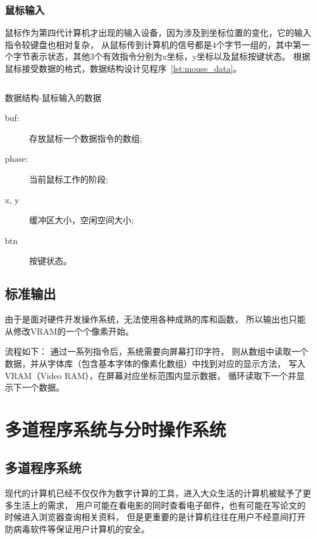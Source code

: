
\subsubsection{鼠标输入}

鼠标作为第四代计算机才出现的输入设备，因为涉及到坐标位置的变化，它的输入指令较键盘也相对复杂，
从鼠标传到计算机的信号都是4个字节一组的，其中第一个字节表示状态，其他3个有效指令分别为x坐标，y坐标以及鼠标按键状态。
根据鼠标接受数据的格式，数据结构设计见程序~\ref{lst:mouse_data}。

\begin{listing}[H]
  \inputminted[tabsize=2, firstline=126, lastline=129,
    linenos=true]{c}{../ZOS/src/kernel/bootpack.h}
  \caption{数据结构-鼠标输入的数据}
  \label{lst:mouse_data}
\end{listing}
\begin{description}
\item[buf:]存放鼠标一个数据指令的数组;
\item[phase:]当前鼠标工作的阶段;
\item[x, y]缓冲区大小，空闲空间大小;
\item[btn]按键状态。
\end{description}


\subsection{标准输出}

由于是面对硬件开发操作系统，无法使用各种成熟的库和函数，
所以输出也只能从修改VRAM的一个个像素开始。

流程如下：
通过一系列指令后，系统需要向屏幕打印字符，
则从数组中读取一个数据，并从字体库（包含基本字体的像素化数组）中找到对应的显示方法，
写入VRAM（Video RAM），在屏幕对应坐标范围内显示数据，
循环读取下一个并显示下一个数据。

\section{多道程序系统与分时操作系统}

\subsection{多道程序系统}

现代的计算机已经不仅仅作为数字计算的工具，进入大众生活的计算机被赋予了更多生活上的需求，
用户可能在看电影的同时查看电子邮件，也有可能在写论文的时候进入浏览器查询相关资料，
但是更重要的是计算机往往在用户不经意间打开防病毒软件等保证用户计算机的安全。


